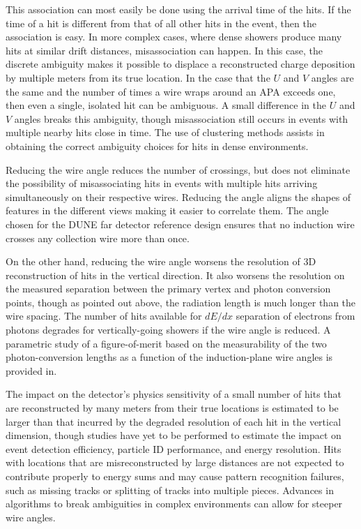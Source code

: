 This association can most easily be done using the arrival time of the
hits.  If the time of a hit is different from that of all other hits
in the event, then the association is easy.  In more complex cases,
where dense showers produce many hits at similar drift distances,
misassociation can happen.  In this case, the discrete ambiguity makes
it possible to displace a reconstructed charge deposition by multiple
meters from its true location.  In the case that the $U$ and $V$
angles are the same and the number of times a wire wraps around an APA
exceeds one, then even a single, isolated hit can be ambiguous.  A
small difference in the $U$ and $V$ angles breaks this ambiguity,
though misassociation still occurs in events with multiple nearby hits
close in time.  The use of clustering methods assists in obtaining the
correct ambiguity choices for hits in dense environments.

Reducing the wire angle reduces the number of crossings, but does not
eliminate the possibility of misassociating hits in events with
multiple hits arriving simultaneously on their respective wires.
Reducing the angle aligns the
shapes of features in the different views making it easier to correlate them.
The angle chosen for the DUNE far detector
reference design ensures that no induction wire crosses any collection
wire more than once.

On the other hand, reducing the wire angle worsens the resolution of
3D reconstruction of hits in the vertical direction. 
It also worsens the resolution on the measured separation between the
primary vertex and photon conversion points, though as pointed out
above, the radiation length is much longer than the wire spacing.  
The number of hits available for $dE/dx$ separation of electrons from
photons degrades for vertically-going showers if the wire angle is
reduced.  A parametric study of a figure-of-merit based on the
measurability of the two photon-conversion lengths as a function of
the induction-plane wire angles is provided
in\cite{wire-orientation}.

The impact on the detector's physics sensitivity
of a small number of hits that are reconstructed by many 
meters from their true locations is estimated to be larger
than that incurred by the degraded resolution of each hit in the vertical
dimension\cite{docdb-8981}, though studies have yet to be performed
to estimate the impact on event detection efficiency,
particle ID performance, and energy resolution.  Hits with locations that are misreconstructed
by large distances are not expected to contribute properly to energy sums and may cause pattern recognition
failures, such as missing tracks or splitting of tracks into multiple pieces.
Advances in algorithms to break ambiguities in complex environments can allow
for steeper wire angles.

